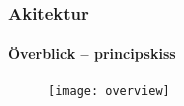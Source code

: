 %
%

\begin{frame}
  \frametitle{Akitektur}
  \framesubtitle{Överblick -- principskiss}
  \begin{figure}
    \centering
    \texttt{[image: overview]}
  \end{figure}
\end{frame}
